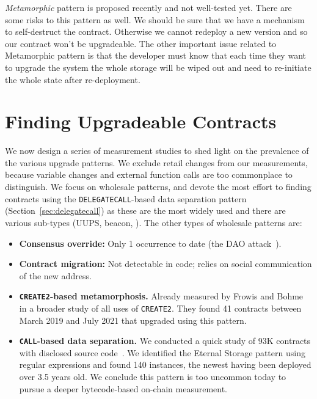 \textit{Metamorphic} pattern is proposed recently and not well-tested yet. There are some risks to this pattern as well. We should be sure that we have a mechanism to self-destruct the contract. Otherwise we cannot redeploy a new version and so our contract won't be upgradeable. The other important issue related to Metamorphic pattern is that the developer must know that each time they want to upgrade the system the whole storage will be wiped out and need to re-initiate the whole state after re-deployment. 


\section{Finding Upgradeable Contracts} 
\label{sec:proxyFinding}

We now design a series of measurement studies to shed light on the prevalence of the various upgrade patterns. We exclude retail changes from our measurements, because variable changes and external function calls are too commonplace to distinguish. We focus on wholesale patterns, and devote the most effort to finding contracts using the \texttt{DELEGATECALL}-based data separation pattern (Section~\ref{sec:delegatecall}) as these are the most widely used and there are various sub-types (UUPS, beacon, \etc). The other types of wholesale patterns are: 
\begin{itemize}
\item \textbf{Consensus override:} Only 1 occurrence to date (the DAO attack~\cite{dhillon2017dao}).
\item \textbf{Contract migration:} Not detectable in code; relies on social communication of the new address.
\item \textbf{\texttt{CREATE2}-based metamorphosis.} Already measured by Frowis and Bohme~\cite{frowisnot} in a broader study of all uses of \texttt{CREATE2}. They found 41 contracts between March 2019 and July 2021 that upgraded using this pattern.
\item \textbf{\texttt{CALL}-based data separation.} We conducted a quick study of 93K contracts with disclosed source code~\cite{smart_contract_sanctuary}. We identified the Eternal Storage pattern using regular expressions and found 140 instances, the newest having been deployed over 3.5 years old. We conclude this pattern is too uncommon today to pursue a deeper bytecode-based on-chain measurement.  
\end{itemize}


